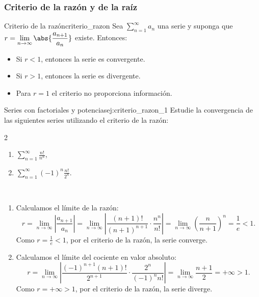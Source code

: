 \subsubsection{Criterio de la razón y de la raíz}

\begin{theorem}{Criterio de la razón}{criterio_razon}
    Sea $\displaystyle \sum_{n=1}^{\infty} a_n$ una serie y suponga que $r = \displaystyle \lim_{n \to \infty} \abs{\frac{a_{n+1}}{a_n}}$ existe. Entonces:
    \begin{itemize}
        \item Si $r < 1$, entonces la serie es convergente.
        \item Si $r > 1$, entonces la serie es divergente.
        \item Para $r = 1$ el criterio no proporciona información.
    \end{itemize}
\end{theorem}

\begin{example}{Series con factoriales y potencias}{ej:criterio_razon_1}
    Estudie la convergencia de las siguientes series utilizando el criterio de la razón:
    \begin{multicols}{2}
    \begin{enumerate}
        \item $\displaystyle \sum_{n=1}^{\infty} \frac{n!}{n^n}$,
        \item $\displaystyle \sum_{n=1}^{\infty}(-1)^n \frac{n!}{2^n}$.
    \end{enumerate}
    \end{multicols}
\end{example}

\begin{soln}
    $\left. \right.$
    \begin{enumerate}
        \item Calculamos el límite de la razón:
        \[ r = \lim_{n \to \infty} \left| \frac{a_{n+1}}{a_n} \right| = \lim_{n \to \infty} \left| \frac{(n+1)!}{(n+1)^{n+1}} \cdot \frac{n^n}{n!} \right| = \lim_{n \to \infty} \left( \frac{n}{n+1} \right)^n = \frac{1}{e} < 1. \]
        Como $r = \frac{1}{e} < 1$, por el criterio de la razón, la serie converge.
        
        \item Calculamos el límite del cociente en valor absoluto:
        \[ r = \lim_{n \to \infty} \left| \frac{(-1)^{n+1} (n+1)!}{2^{n+1}} \cdot \frac{2^n}{(-1)^n n!} \right| = \lim_{n \to \infty} \frac{n+1}{2} = +\infty > 1. \]
        Como $r = +\infty > 1$, por el criterio de la razón, la serie diverge.
    \end{enumerate}
\end{soln}

